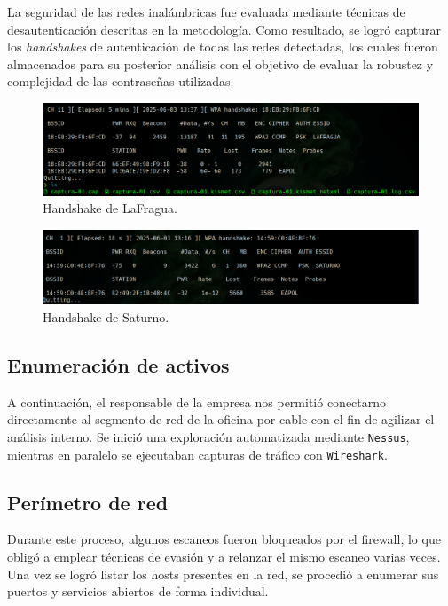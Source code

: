 \documentclass[a4paper, 11pt]{article}
\begin{document}
La seguridad de las redes inalámbricas fue evaluada mediante técnicas de desautenticación descritas en la metodología. Como resultado, se logró capturar los \textit{handshakes} de autenticación de todas las redes detectadas, los cuales fueron almacenados para su posterior análisis con el objetivo de evaluar la robustez y complejidad de las contraseñas utilizadas.

\begin{figure}[H]
    \centering
    \includegraphics[width=1\textwidth]{images/redfragua_handshake.png}
    \caption{Handshake de LaFragua.}
    \label{fig:handshakefragua}
\end{figure}

\begin{figure}[H]
    \centering
    \includegraphics[width=1\textwidth]{images/redsaturno_handshake.png}
    \caption{Handshake de Saturno.}
    \label{fig:handshakesaturno}
\end{figure}


\subsection*{Enumeración de activos}

A continuación, el responsable de la empresa nos permitió conectarno directamente al segmento de red de la oficina por cable con el fin de agilizar el análisis interno. Se inició una exploración automatizada mediante \texttt{Nessus}, mientras en paralelo se ejecutaban capturas de tráfico con \texttt{Wireshark}. 

\subsection*{Perímetro de red}

Durante este proceso, algunos escaneos fueron bloqueados por el firewall, lo que obligó a emplear técnicas de evasión y a relanzar el mismo escaneo varias veces. Una vez se logró listar los hosts presentes en la red, se procedió a enumerar sus puertos y servicios abiertos de forma individual.
\end{document}
